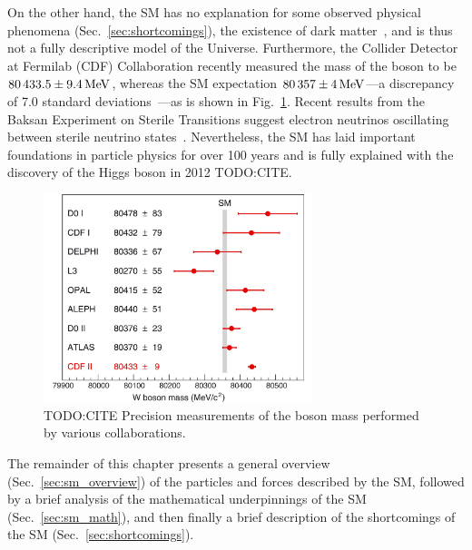 On the other hand, the SM has no explanation for some observed physical phenomena (Sec.~\ref{sec:shortcomings}), \eg the existence of dark matter~\cite{particle_data_group_review_2020}, and is thus not a fully descriptive model of the Universe.
Furthermore, the Collider Detector at Fermilab (CDF) Collaboration recently measured the mass of the \PW boson to be $80\,433.5 \pm 9.4\,\text{Me\hspace{-.08em}V}$, whereas the SM expectation $80\,357 \pm 4\,\text{Me\hspace{-.08em}V}$---a discrepancy of 7.0 standard deviations~\cite{cdf_collaboration_high-precision_2022}---as is shown in Fig.~\ref{fig:wmass}.
Recent results from the Baksan Experiment on Sterile Transitions suggest electron neutrinos oscillating between sterile neutrino states~\cite{PhysRevLett.128.232501}.
Nevertheless, the SM has laid important foundations in particle physics for over 100 years and is fully explained with the discovery of the Higgs boson in 2012 TODO:CITE.
\begin{figure}[pbth]
    \centering
    \includegraphics[width=0.7\textwidth,keepaspectratio]{figures/sm/wmass.pdf}
        \caption{TODO:CITE Precision measurements of the \PW boson mass performed by various collaborations.} 
        \label{fig:wmass}
    \end{figure}

The remainder of this chapter presents a general overview (Sec.~\ref{sec:sm_overview}) of the particles and forces described by the SM,
followed by a brief analysis of the mathematical underpinnings of the SM (Sec.~\ref{sec:sm_math}),
and then finally a brief description of the shortcomings of the SM (Sec.~\ref{sec:shortcomings}).

